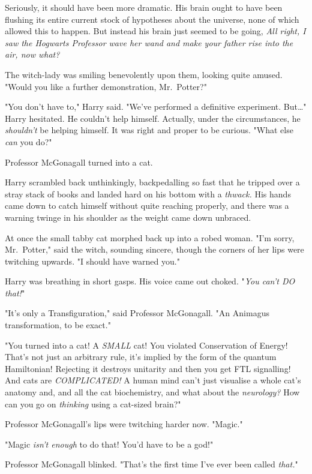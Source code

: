 Seriously, it should have been more dramatic. His brain ought to have been
flushing its entire current stock of hypotheses about the universe, none of
which allowed this to happen. But instead his brain just seemed to be going,
\emph{All right, I saw the Hogwarts Professor wave her wand and make your
father rise into the air, now what?}

The witch-lady was smiling benevolently upon them, looking quite amused. "Would
you like a further demonstration, Mr.~Potter?"

"You don't have to," Harry said. "We've performed a definitive experiment.
But{\ldots}" Harry hesitated. He couldn't help himself. Actually, under the
circumstances, he \emph{shouldn't} be helping himself. It was right and proper
to be curious. "What else \emph{can} you do?"

Professor McGonagall turned into a cat.

Harry scrambled back unthinkingly, backpedalling so fast that he tripped over a
stray stack of books and landed hard on his bottom with a \emph{thwack.} His
hands came down to catch himself without quite reaching properly, and there was
a warning twinge in his shoulder as the weight came down unbraced.

At once the small tabby cat morphed back up into a robed woman. "I'm sorry,
Mr.~Potter," said the witch, sounding sincere, though the corners of her lips
were twitching upwards. "I should have warned you."

Harry was breathing in short gasps. His voice came out choked. "\emph{You can't
DO that!}"

"It's only a Transfiguration," said Professor McGonagall. "An Animagus
transformation, to be exact."

"You turned into a cat! A \emph{SMALL} cat! You violated Conservation of
Energy! That's not just an arbitrary rule, it's implied by the form of the
quantum Hamiltonian! Rejecting it destroys unitarity and then you get FTL
signalling! And cats are \emph{COMPLICATED!} A human mind can't just visualise
a whole cat's anatomy and, and all the cat biochemistry, and what about the
\emph{neurology?} How can you go on \emph{thinking} using a cat-sized brain?"

Professor McGonagall's lips were twitching harder now. "Magic."

"Magic \emph{isn't enough} to do that! You'd have to be a god!"

Professor McGonagall blinked. "That's the first time I've ever been called
\emph{that.}"

